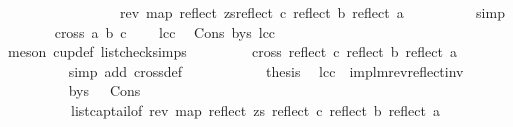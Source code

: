 \begin{isabellebody}
\ \ \ \ \ \ \ \ \ \ \ \ \ \ \ \ {\isacharequal}{\kern0pt}\ {\isacharparenleft}{\kern0pt}rev\ {\isacharparenleft}{\kern0pt}map\ reflect\ zs{\isacharparenright}{\kern0pt}{\isacharparenright}{\kern0pt}{\isacharat}{\kern0pt}{\isacharparenleft}{\kern0pt}{\isacharbrackleft}{\kern0pt}reflect\ c{\isacharcomma}{\kern0pt}\ reflect\ b{\isacharcomma}{\kern0pt}\ reflect\ a{\isacharbrackright}{\kern0pt}{\isacharparenright}{\kern0pt}{\isachardoublequoteclose}\isanewline
\ \ \ \ \ \ \ \ \isamarkupfalse%
\ simp\isanewline
\ \ \ \ \ \ \isamarkupfalse%
\ {\isachardoublequoteopen}cross{}\ a\ b\ c\ {\isachargreater}{\kern0pt}\ {}{\isachardoublequoteclose}\ \isamarkupfalse%
\ lcc\ \isamarkupfalse%
\ Cons\ b{\isacharunderscore}{\kern0pt}ys\ lcc\ \isanewline
\ \ \ \ \ \ \ \ \isamarkupfalse%
\ {\isacharparenleft}{\kern0pt}meson\ cup{}{\isacharunderscore}{\kern0pt}def\ list{\isacharunderscore}{\kern0pt}check{\isachardot}{\kern0pt}simps{\isacharparenleft}{\kern0pt}{}{\isacharparenright}{\kern0pt}{\isacharparenright}{\kern0pt}\ \isanewline
\ \ \ \ \ \ \isamarkupfalse%
\ {\isachardoublequoteopen}cross{}\ {\isacharparenleft}{\kern0pt}reflect\ c{\isacharparenright}{\kern0pt}\ {\isacharparenleft}{\kern0pt}reflect\ b{\isacharparenright}{\kern0pt}\ {\isacharparenleft}{\kern0pt}reflect\ a{\isacharparenright}{\kern0pt}\ {\isacharless}{\kern0pt}\ {}{\isachardoublequoteclose}\ \isanewline
\ \ \ \ \ \ \ \ \isamarkupfalse%
\ {\isacharparenleft}{\kern0pt}simp\ add{\isacharcolon}{\kern0pt}\ cross{}{\isacharunderscore}{\kern0pt}def{\isacharparenright}{\kern0pt}\ \ \isanewline
\isanewline
\ \ \ \ \ \ \isamarkupfalse%
\ \isamarkupfalse%
\ {\isacharquery}{\kern0pt}thesis\ \isamarkupfalse%
\ lcc\ \ implm{\isacharunderscore}{\kern0pt}rev{\isacharunderscore}{\kern0pt}reflect{\isacharunderscore}{\kern0pt}inv\ \isanewline
\ \ \ \ \ \ \ \ \isamarkupfalse%
\ b{\isacharunderscore}{\kern0pt}ys\ \ \ Cons\ \isamarkupfalse%
\ \isanewline
\ \ \ \ \ \ \ \ \ \ list{\isacharunderscore}{\kern0pt}cap{\isacharunderscore}{\kern0pt}tail{\isacharbrackleft}{\kern0pt}of\ {\isachardoublequoteopen}{\isacharparenleft}{\kern0pt}rev\ {\isacharparenleft}{\kern0pt}map\ reflect\ zs{\isacharparenright}{\kern0pt}{\isacharparenright}{\kern0pt}{\isachardoublequoteclose}\ {\isachardoublequoteopen}reflect\ c{\isachardoublequoteclose}\ {\isachardoublequoteopen}reflect\ b{\isachardoublequoteclose}\ {\isachardoublequoteopen}reflect\ a{\isachardoublequoteclose}{\isacharbrackright}{\kern0pt}\isanewline

\end{isabellebody}
